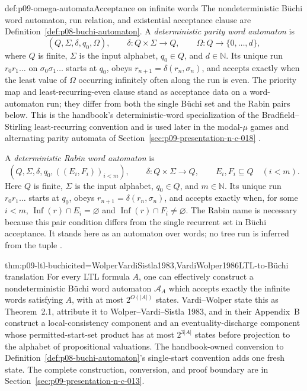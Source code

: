 \begin{hbdefinition}{def:p09-omega-automata}{Acceptance on infinite words}
The nondeterministic B\"uchi word automaton, run relation, and existential
acceptance clause are Definition~\ref{def:p08-buchi-automaton}.  A
\emph{deterministic parity word automaton} is
\[
 (Q,\Sigma,\delta,q_0,\Omega),
 \qquad
 \delta:Q\times\Sigma\to Q,
 \qquad
 \Omega:Q\to\{0,\ldots,d\},
\]
where \(Q\) is finite, \(\Sigma\) is the input alphabet, \(q_0\in Q\), and
\(d\in\mathbb N\).  Its unique run
\(r_0r_1\ldots\) on \(\sigma_0\sigma_1\ldots\) starts at \(q_0\), obeys
\(r_{n+1}=\delta(r_n,\sigma_n)\), and accepts exactly when the least value of
\(\Omega\) occurring infinitely often along the run is even.  The priority map
and least-recurring-even clause stand as acceptance data on a word-automaton
run; they differ from both the single B\"uchi set and the Rabin pairs below.
This is the handbook's deterministic-word specialization of the
Bradfield--Stirling least-recurring convention and is used later in the
modal-\(\mu\) games and alternating parity automata of
Section~\ref{sec:p09-presentation-n-c-018}
\cite[\S\S4--5]{BradfieldStirling2007}.

A \emph{deterministic Rabin word automaton} is
\[
 (Q,\Sigma,\delta,q_0,((E_i,F_i))_{i<m}),
 \qquad
 \delta:Q\times\Sigma\to Q,
 \qquad
 E_i,F_i\subseteq Q\quad(i<m).
\]
Here \(Q\) is finite, \(\Sigma\) is the input alphabet, \(q_0\in Q\), and
\(m\in\mathbb N\).
Its unique run \(r_0r_1\ldots\) starts at \(q_0\), obeys
\(r_{n+1}=\delta(r_n,\sigma_n)\), and accepts exactly when, for some \(i<m\),
\(\operatorname{Inf}(r)\cap E_i=\varnothing\) and
\(\operatorname{Inf}(r)\cap F_i\ne\varnothing\).  The Rabin name is necessary
because this pair condition differs from the single recurrent set in B\"uchi
acceptance.  It stands here as an automaton over words; no tree run is inferred
from the tuple \cite[Def.~5.1]{Thomas1996Report}.
\end{hbdefinition}

\begin{hbtheorem}{thm:p09-ltl-buchi}{cited=WolperVardiSistla1983,VardiWolper1986}{LTL-to-B\"uchi translation}
For every LTL formula \(A\), one can effectively construct a nondeterministic
B\"uchi word automaton \(\mathcal A_A\) which accepts exactly the infinite
words satisfying \(A\), with at most \(2^{O(|A|)}\) states.  Vardi--Wolper
state this as Theorem~2.1, attribute it to Wolper--Vardi--Sistla 1983, and in
their Appendix~B construct a
local-consistency component and an eventuality-discharge component whose
permitted-start-set product has at most \(2^{3|A|}\) states before projection
to the alphabet of propositional valuations.  The handbook-owned conversion to
Definition~\ref{def:p08-buchi-automaton}'s single-start convention adds one
fresh state.  The complete construction, conversion, and proof boundary are in
Section~\ref{sec:p09-presentation-n-c-013}.
\end{hbtheorem}

